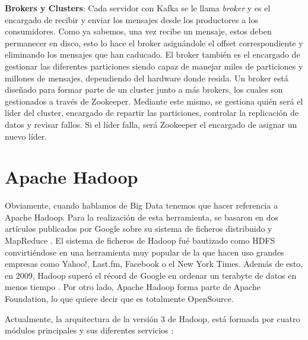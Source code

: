 \textbf{Brokers y Clusters}: Cada servidor con Kafka se le llama {\em
  broker} y es el encargado de recibir y enviar los mensajes desde los
productores a los consumidores. Como ya sabemos, una vez recibe un mensaje,
estos deben permanecer en disco, esto lo hace el broker asignándole el
offset correspondiente y eliminando los mensajes que han caducado. El
broker también es el encargado de gestionar las diferentes particiones
siendo capaz de manejar miles de particiones y millones de mensajes,
dependiendo del hardware donde resida. Un broker está diseñado para formar
parte de un cluster junto a más brokers, los cuales son gestionados a
través de Zookeeper. Mediante este mismo, se gestiona quién será el líder
del cluster, encargado de repartir las particiones, controlar la
replicación de datos y revisar fallos. Si el líder falla, será Zookeeper el
encargado de asignar un nuevo líder.


\section{Apache Hadoop\label{Hadoop}}

Obviamente, cuando hablamos de Big Data tenemos que hacer referencia a
Apache Hadoop. Para la realización de esta herramienta, se basaron en dos
artículos publicados por Google sobre su sistema de ficheros distribuido
\cite{Hdp-2} y MapReduce \cite{Hdp-3}. El sistema de ficheros de Hadoop fué
bautizado como HDFS convirtiéndose en una herramienta muy popular de la que
hacen uso grandes empresas como Yahoo!, Last.fm, Facebook o el New York
Times. Además de esto, en 2009, Hadoop superó el récord de Google en
ordenar un terabyte de datos en menos tiempo \cite{Hdp-1}. Por otro lado,
Apache Hadoop forma parte de Apache Foundation, lo que quiere decir que es
totalmente OpenSource.

Actualmente, la arquitectura de la versión 3 de Hadoop, está formada por
cuatro módulos principales y sus diferentes servicios \cite{Hdp-4}:

